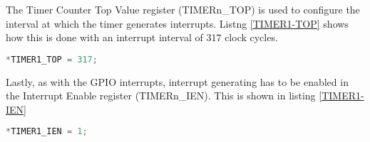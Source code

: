 The Timer Counter Top Value register (TIMERn\_TOP) is used to configure the interval at which the timer generates interrupts. Listng \ref{TIMER1-TOP} shows how this is done with an interrupt interval of $317$ clock cycles.

\begin{lstlisting}[language=C, label=TIMER1-TOP, caption=Setting interrupt interval]
*TIMER1_TOP = 317;
\end{lstlisting}

Lastly, as with the GPIO interrupts, interrupt generating has to be enabled in the Interrupt Enable register (TIMERn\_IEN). This is shown in listing \ref{TIMER1-IEN}

\begin{lstlisting}[language=C, label=TIMER1-IEN, caption=Interrupt generation]
*TIMER1_IEN = 1;
\end{lstlisting}
